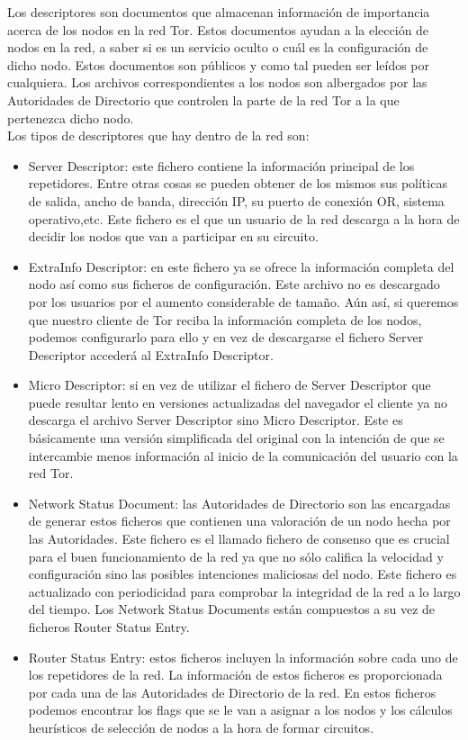 Los descriptores son documentos que almacenan información de importancia acerca de los nodos en la red Tor. Estos documentos ayudan a la elección de nodos en la red, a saber si es un servicio oculto o cuál es la configuración de dicho nodo. Estos documentos son públicos y como tal pueden ser leídos por cualquiera. Los archivos correspondientes a los nodos son albergados por las Autoridades de Directorio que controlen la parte de la red Tor a la que pertenezca dicho nodo.\\
Los tipos de descriptores que hay dentro de la red son:\\
\begin{itemize}
	\item Server Descriptor: este fichero contiene la información principal de los repetidores. Entre otras cosas se pueden obtener de los mismos sus políticas de salida, ancho de banda, dirección IP, su puerto de conexión OR, sistema operativo,etc. Este fichero es el que un usuario de la red descarga a la hora de decidir los nodos que van a participar en su circuito.
	\item ExtraInfo Descriptor: en este fichero ya se ofrece la información completa del nodo así como sus ficheros de configuración. Este archivo no es descargado por los usuarios por el aumento considerable de tamaño. Aún así, si queremos que nuestro cliente de Tor reciba la información completa de los nodos, podemos configurarlo para ello y en vez de descargarse el fichero Server Descriptor accederá al ExtraInfo Descriptor.
	\item Micro Descriptor: si en vez de utilizar el fichero de Server Descriptor que puede resultar lento en versiones actualizadas del navegador el cliente ya no descarga el archivo Server Descriptor sino Micro Descriptor. Este es básicamente una versión simplificada del original con la intención de que se intercambie menos información al inicio de la comunicación del usuario con la red Tor.
	\item Network Status Document: las Autoridades de Directorio son las encargadas de generar estos ficheros que contienen una valoración de un nodo hecha por las Autoridades. Este fichero es el llamado fichero de consenso que es crucial para el buen funcionamiento de la red ya que no sólo califica la velocidad y configuración sino las posibles intenciones maliciosas del nodo. Este fichero es actualizado con periodicidad para comprobar la integridad de la red a lo largo del tiempo. Los Network Status Documents están compuestos a su vez de ficheros Router Status Entry.
	\item Router Status Entry: estos ficheros incluyen la información sobre cada uno de los repetidores de la red. La información de estos ficheros es proporcionada por cada una de las Autoridades de Directorio de la red. En estos ficheros podemos encontrar los flags que se le van a asignar a los nodos y los cálculos heurísticos de selección de nodos a la hora de formar circuitos.

\end{itemize}
